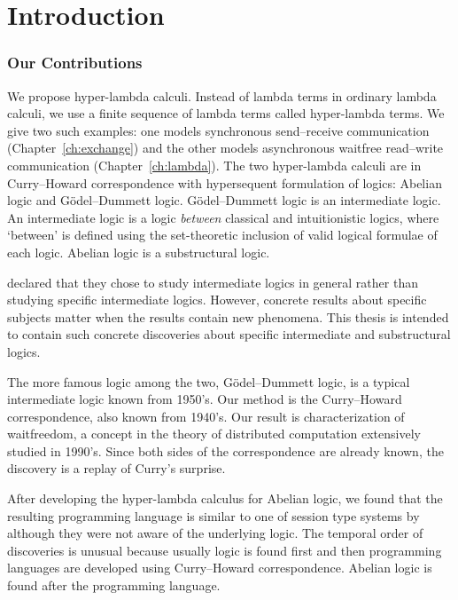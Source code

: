 \chapter{Introduction}

\subsection{Our Contributions}

We propose hyper-lambda calculi.
Instead of lambda terms in ordinary lambda calculi,
we use a finite sequence of lambda terms called hyper-lambda terms.
We give two such examples:
one models synchronous send--receive communication (Chapter~\ref{ch:exchange}) and
the other models asynchronous waitfree
read--write communication (Chapter~\ref{ch:lambda}).
The two hyper-lambda calculi are in Curry--Howard correspondence with
hypersequent formulation of logics: Abelian logic and G\"odel--Dummett
logic.
G\"odel--Dummett logic is an intermediate logic.
An intermediate logic is a logic \textit{between} classical and
intuitionistic logics, where `between' is defined using the
set-theoretic inclusion of valid logical formulae of each logic.
Abelian logic is a substructural logic.

\citet{hosoi-ono} declared that they chose to study intermediate
logics in
general rather than studying specific intermediate logics.
However, concrete results about specific subjects matter when the
results contain new phenomena.
This thesis is intended to contain such concrete discoveries
about specific intermediate and substructural logics.

The more famous logic among the two, G\"odel--Dummett logic, is
a typical intermediate logic known from 1950's.
Our method is the Curry--Howard correspondence, also known from 1940's.
Our result is characterization of waitfreedom, a concept in the theory
of distributed computation extensively studied in 1990's.
Since both sides of the correspondence are already known,
the discovery is a replay of Curry's surprise.

After developing the hyper-lambda calculus for Abelian logic,
we found that the resulting programming language is similar to one of
session type systems by \citet{giunti2010} although they were not aware
of the underlying logic.  The temporal order of discoveries is unusual
because usually logic is found first and then programming languages are
developed using Curry--Howard correspondence.  Abelian logic is found
after the programming language.

